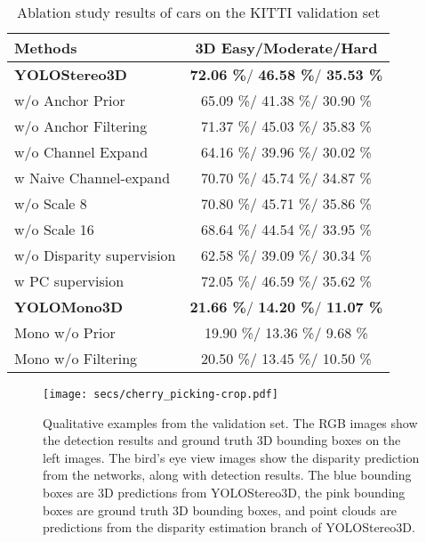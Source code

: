 \documentclass[letterpaper, 10 pt, conference]{ieeeconf}
\begin{document}
\begin{table}
    \caption{Ablation study results of cars on the KITTI validation set}
    \begin{tabular*}{0.505\textwidth}{  |l|c| }
        \hline
        {\bf Methods} & { 3D Easy/Moderate/Hard } \\ \hline
\textbf{YOLOStereo3D}               & \textbf{72.06 \%}/  \textbf{46.58 \%}/   \textbf{35.53 \%}  \\
        \hline
        w/o Anchor Prior        & 65.09 \%/   41.38 \%/  30.90 \% \\
        w/o Anchor Filtering    & 71.37 \%/   45.03 \%/  35.83 \% \\
        \hline
        w/o Channel Expand      & 64.16 \%/   39.96 \%/   30.02 \% \\
        w Naive Channel-expand  & 70.70 \%/   45.74 \%/   34.87 \% \\
        \hline
        w/o Scale 8             & 70.80 \%/   45.71 \%/   35.86 \% \\
        w/o Scale 16            & 68.64 \%/   44.54 \%/   33.95 \% \\
        \hline
        w/o Disparity supervision& 62.58 \%/   39.09 \%/   30.34 \% \\
        w PC supervision         & 72.05 \%/   46.59 \%/   35.62 \% \\
        \hline
        \textbf{YOLOMono3D}               & \textbf{21.66 \%}/  \textbf{14.20 \%}/   \textbf{11.07 \%}  \\
        \hline
        Mono w/o Prior        & 19.90 \%/   13.36 \%/   9.68 \% \\
        Mono w/o Filtering    & 20.50 \%/   13.45 \%/  10.50 \% \\
    \hline
    \end{tabular*} 
    \label{tab:ablation_study}
\end{table}
 \begin{figure*}
    \centering
  \texttt{[image: secs/cherry\_picking-crop.pdf]}
    \caption{Qualitative examples from the validation set. The RGB images show the detection results and ground truth 3D bounding boxes on the left images. The bird's eye view images show the disparity prediction from the networks, along with detection results.
    The blue bounding boxes are 3D predictions from YOLOStereo3D, the pink bounding boxes are ground truth 3D bounding boxes, and point clouds are predictions from the disparity estimation branch of YOLOStereo3D.
    }
    \label{fig:examples}
\end{figure*} 
\end{document}
